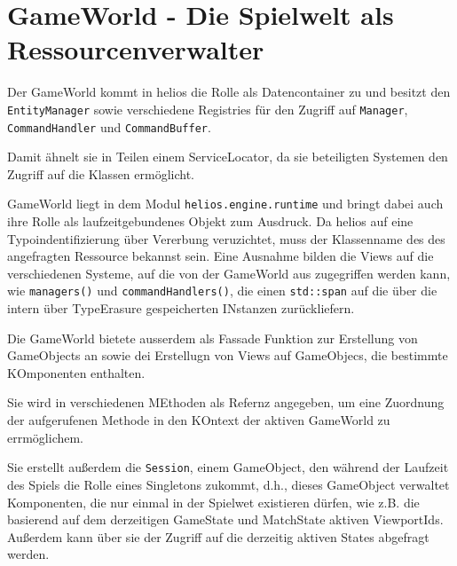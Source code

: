 \chapter{GameWorld - Die Spielwelt als Ressourcenverwalter}

Der GameWorld kommt in helios die Rolle als Datencontainer zu und besitzt den \texttt{EntityManager} sowie verschiedene Registries für den Zugriff auf \texttt{Manager}, \texttt{CommandHandler} und \texttt{CommandBuffer}.

Damit ähnelt sie in Teilen einem ServiceLocator, da sie beteiligten Systemen den Zugriff auf die Klassen ermöglicht.

GameWorld liegt in dem Modul \texttt{helios.engine.runtime} und bringt dabei auch ihre Rolle als laufzeitgebundenes Objekt zum Ausdruck.
Da helios auf eine Typoindentifizierung über Vererbung veruzichtet, muss der Klassenname des des angefragten Ressource bekannst sein.
Eine Ausnahme bilden die Views auf die verschiedenen Systeme, auf die von der GameWorld aus zugegriffen werden kann, wie \texttt{managers()} und \texttt{commandHandlers()}, die einen \texttt{std::span} auf die über die intern über TypeErasure gespeicherten INstanzen zurückliefern.

Die GameWorld bietete ausserdem als Fassade Funktion zur Erstellung von GameObjects an sowie dei Erstellugn von Views auf GameObjecs, die bestimmte KOmponenten enthalten.

Sie wird in verschiedenen MEthoden als Refernz angegeben, um eine Zuordnung der aufgerufenen Methode in den KOntext der aktiven GameWorld zu errmöglichem.

Sie erstellt außerdem die \texttt{Session}, einem GameObject, den während  der Laufzeit des Spiels die Rolle eines Singletons zukommt, d.h., dieses GameObject verwaltet Komponenten, die nur einmal in der Spielwet existieren dürfen, wie z.B. die basierend auf dem derzeitigen GameState und MatchState aktiven ViewportIds.
Außerdem kann über sie der Zugriff auf die derzeitig aktiven States abgefragt werden.